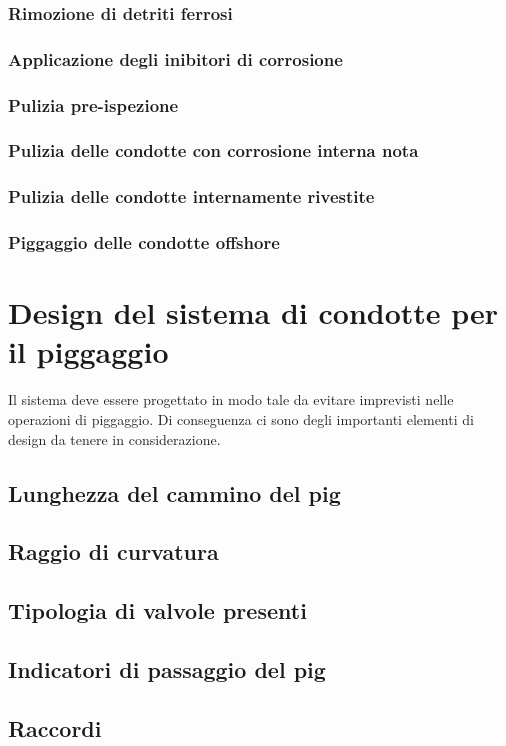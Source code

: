 \subsubsection{Rimozione di detriti ferrosi}
\subsubsection{Applicazione degli inibitori di corrosione}
\subsubsection{Pulizia pre-ispezione}
\subsubsection{Pulizia delle condotte con corrosione interna nota}
\subsubsection{Pulizia delle condotte internamente rivestite}
\subsubsection{Piggaggio delle condotte offshore}


\section{Design del sistema di condotte per il piggaggio}
Il sistema deve essere progettato in modo tale da evitare imprevisti nelle operazioni di piggaggio. Di conseguenza ci sono degli importanti elementi di design da tenere in considerazione.
\subsection{Lunghezza del cammino del pig}
\subsection{Raggio di curvatura}
\subsection{Tipologia di valvole presenti}
\subsection{Indicatori di passaggio del pig}
\subsection{Raccordi}
